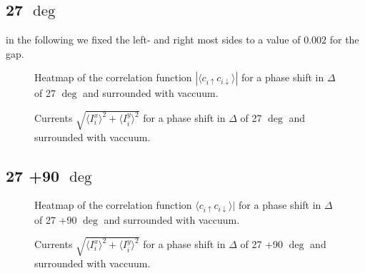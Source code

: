\documentclass[..\main.tex]{subfile}
\begin{document}
\subsection{27 $\deg$}
in the following we fixed the left- and right most sides to a value of $0.002$ for the gap.
\begin{figure}[H]
    \centering
    
    \caption{Heatmap of the correlation function $|\langle c_{i\uparrow} c_{i\downarrow}\rangle|$ for a phase shift in $\Delta$ of 27 $\deg$ and surrounded with vaccuum.}
\end{figure}

\begin{figure}[H]
    \centering
    
    \caption{Currents $\sqrt{\langle I^x_i\rangle^2 + \langle I^y_i\rangle^2}$ for a phase shift in $\Delta$ of 27 $\deg$ and surrounded with vaccuum.}
\end{figure}

\subsection{27 +90 $\deg$}
\begin{figure}[H]
    \centering
    
    \caption{Heatmap of the correlation function $\langle c_{i\uparrow} c_{i\downarrow}\rangle|$ for a phase shift in $\Delta$ of 27 +90 $\deg$ and surrounded with vaccuum.}
\end{figure}

\begin{figure}[H]
    \centering
    
        \caption{Currents $\sqrt{\langle I^x_i\rangle^2 + \langle I^y_i\rangle^2}$ for a phase shift in $\Delta$ of 27 +90 $\deg$ and surrounded with vaccuum.}
\end{figure}
\end{document}
